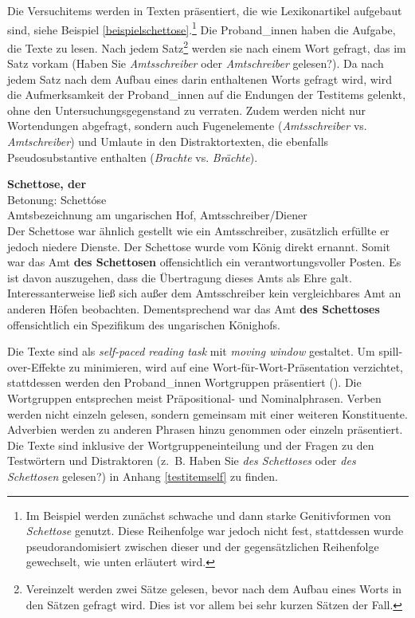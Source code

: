 Die Versuchitems werden in Texten präsentiert, die wie Lexikonartikel aufgebaut sind, siehe Beispiel \ref{beispielschettose}.\footnote{Im Beispiel werden zunächst schwache und dann starke Genitivformen von \textit{Schettose} genutzt. Diese Reihenfolge war jedoch nicht fest, stattdessen wurde pseudorandomisiert zwischen dieser und der gegensätzlichen Reihenfolge gewechselt, wie unten erläutert wird.} Die Proband\_innen haben die Aufgabe, die Texte zu lesen. Nach jedem Satz\footnote{Vereinzelt werden zwei Sätze gelesen, bevor nach dem Aufbau eines Worts in den Sätzen gefragt wird. Dies ist vor allem bei sehr kurzen Sätzen der Fall.} werden sie nach einem Wort gefragt, das im Satz vorkam (Haben Sie \textit{Amtsschreiber} oder \textit{Amtschreiber} gelesen?). Da nach jedem Satz nach dem Aufbau eines darin enthaltenen Worts gefragt wird, wird die Aufmerksamkeit der Proband\_innen auf die Endungen der Testitems gelenkt, ohne den Untersuchungsgegenstand zu verraten. Zudem werden nicht nur Wortendungen abgefragt, sondern auch Fugenelemente (\textit{Amtsschreiber} vs. \textit{Amtschreiber}) und Umlaute in den Distraktortexten, die ebenfalls Pseudosubstantive enthalten (\textit{Brachte} vs. \textit{Brächte}).\largerpage


\begin{exe}
\ex \label{beispielschettose} 
\textbf{Schettose, der}\\
Betonung: Schettóse\\
Amtsbezeichnung am ungarischen Hof, Amtsschreiber/Diener\medskip\\
Der Schettose war ähnlich gestellt wie ein Amtsschreiber, zusätzlich erfüllte er jedoch niedere Dienste. Der Schettose wurde vom König direkt ernannt.  Somit war das Amt \textbf{des Schettosen} offensichtlich ein verantwortungsvoller Posten. Es ist davon auszugehen, dass die Übertragung dieses Amts als Ehre galt. Interessanterweise ließ sich außer dem Amtsschreiber kein vergleichbares Amt an anderen Höfen beobachten. Dementsprechend war das Amt \textbf{des Schettoses} offensichtlich ein Spezifikum des ungarischen Könighofs.
\end{exe}

Die Texte sind als \textit{self-paced reading task} mit \textit{moving window} gestaltet. Um spill-over-Effekte zu minimieren, wird auf eine Wort-für-Wort-Präsentation verzichtet, stattdessen werden den Proband\_innen Wortgruppen präsentiert (\cite[121--122]{McDonough.2012}). Die Wortgruppen entsprechen meist Präpositional- und Nominalphrasen. Verben werden nicht einzeln gelesen, sondern gemeinsam mit einer weiteren Konstituente. Adverbien werden zu anderen Phrasen hinzu genommen oder einzeln präsentiert. Die Texte sind inklusive der Wortgruppeneinteilung und der Fragen zu den Testwörtern und Distraktoren (z.~B. Haben Sie \textit{des Schettoses} oder \textit{des Schettosen} gelesen?) in Anhang \ref{testitemself} zu finden.



